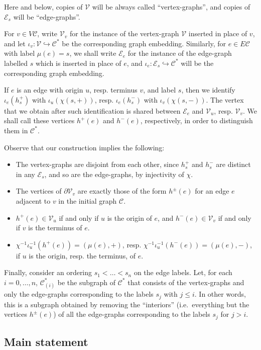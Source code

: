 \documentclass[10pt,a4paper]{amsart}
\newcommand{\ie}{i.e.\ }
\theoremstyle{definition}
\newcommand{\cC}{\mathcal{C}}
\newcommand{\cV}{\mathcal{V}}
\newcommand{\cE}{\mathcal{E}}
\begin{document}
Here and below, copies of $\cV$ will be always called ``vertex-graphs'', and copies of $\cE_s$ will be ``edge-graphs''. 

For $v\in V\cC$, write $\cV_v$ for the instance of the vertex-graph $\cV$ inserted in place of $v$, and let ${\iota}_v:\cV {\hookrightarrow} \cC^*$ be the corresponding graph embedding. Similarly, for $e\in E\cC$ with label $\mu(e)=s$, we shall write $\cE_e$ for the instance of the edge-graph labelled $s$ which is inserted in place of $e$, and ${\iota}_e:\cE_{s}{\hookrightarrow} \cC^*$ will be the corresponding graph embedding.

If $e$ is an edge with origin $u$, resp. terminus $v$, and label $s$, then we identify ${\iota}_e(h_s^{+})$ with $ {\iota}_u({\chi}(s, +))$, resp. ${\iota}_e(h_s^{-})$ with ${\iota}_v({\chi}(s, -))$. The vertex that we obtain after such identification is shared between $\cE_e$ and $\cV_u$, resp. $\cV_v$. We shall call these vertices $h^{+}(e)$ and $h^{-}(e)$, respectively, in order to distinguish them in $\cC^*$.

Observe that our construction implies the following:
\begin{itemize}
\item The vertex-graphs are disjoint from each other, since $h_s^+$ and $h_s^-$ are distinct in any $\cE_s$, and so are the edge-graphs, by injectivity of ${\chi}$.
\item The vertices of ${\partial}\cV_v$ are exactly those of the form $h^{\pm}(e)$ for an edge $e$ adjacent to $v$ in the initial graph $\cC$.
\item $h^{+}(e) \in \cV_u$ if and only if $u$ is the origin of $e$, and $h^{-}(e) \in \cV_v$ if and only if $v$ is the terminus of $e$.
\item ${\chi}^{-1}{\iota}_u^{-1}(h^+(e)) = ({\mu}(e), +)$, resp. ${\chi}^{-1}{\iota}_u^{-1}(h^-(e)) = ({\mu}(e), -)$, if $u$ is the origin, resp. the terminus, of $e$.\end{itemize}

Finally, consider an ordering $s_{1} < \dots < s_n$ on the edge labels. Let, for each $i=0, \dots, n$, $\cC^*_{(i)}$ be the subgraph of $\cC^*$ that consists of the vertex-graphs and only the edge-graphs corresponding to the labels $s_j$ with $j \leq i$. In other words, this is a subgraph obtained by removing the ``interiors'' (\ie everything but the vertices $h^{\pm}(e)$) of all the edge-graphs corresponding to the labels $s_j$ for $j > i$.

\subsection{Main statement}\label{section:main-statement-substitution}
\end{document}

